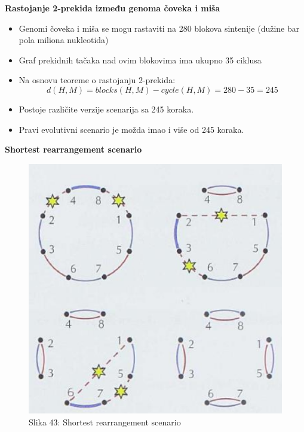 \documentclass{article}
\begin{document}
\noindent \textbf{Rastojanje 2-prekida između genoma čoveka i miša}
\begin{itemize}
    \item Genomi čoveka i miša se mogu rastaviti na 280 blokova sintenije (dužine bar pola miliona nukleotida)
    \item Graf prekidnih tačaka nad ovim blokovima ima ukupno 35 ciklusa
    \item Na osnovu teoreme o rastojanju 2-prekida:
    $$d(H, M) = blocks(H, M) - cycle(H, M) = 280 - 35 = 245$$
    \item Postoje različite verzije scenarija sa 245 koraka.
    \item Pravi evolutivni scenario je možda imao i više od 245 koraka.
\end{itemize}
\newpage
\hspace{2cm} {\textbf{Shortest rearrangement scenario}}

\begin{figure}[h!]
\centering
\includegraphics[scale=0.7]{slike/izmena2prekidima3.PNG}
\caption{Slika 43: Shortest rearrangement scenario}
\label{slika:X}
\end{figure}
\end{document}
